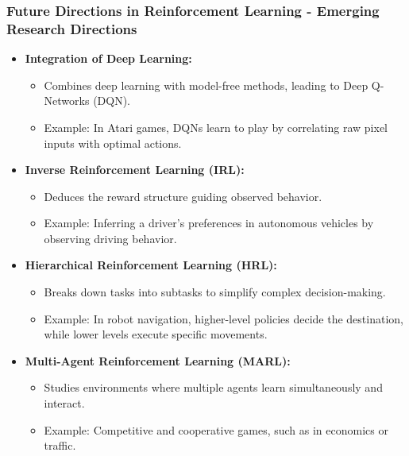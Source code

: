 \documentclass[aspectratio=169]{beamer}
\begin{document}
\begin{frame}[fragile]
    \frametitle{Future Directions in Reinforcement Learning - Emerging Research Directions}
    \begin{itemize}
        \item \textbf{Integration of Deep Learning:}
        \begin{itemize}
            \item Combines deep learning with model-free methods, leading to Deep Q-Networks (DQN).
            \item Example: In Atari games, DQNs learn to play by correlating raw pixel inputs with optimal actions.
        \end{itemize}
        
        \item \textbf{Inverse Reinforcement Learning (IRL):}
        \begin{itemize}
            \item Deduces the reward structure guiding observed behavior.
            \item Example: Inferring a driver’s preferences in autonomous vehicles by observing driving behavior.
        \end{itemize}
        
        \item \textbf{Hierarchical Reinforcement Learning (HRL):}
        \begin{itemize}
            \item Breaks down tasks into subtasks to simplify complex decision-making.
            \item Example: In robot navigation, higher-level policies decide the destination, while lower levels execute specific movements.
        \end{itemize}
        
        \item \textbf{Multi-Agent Reinforcement Learning (MARL):}
        \begin{itemize}
            \item Studies environments where multiple agents learn simultaneously and interact.
            \item Example: Competitive and cooperative games, such as in economics or traffic.
        \end{itemize}
    \end{itemize}
\end{frame}
\end{document}
